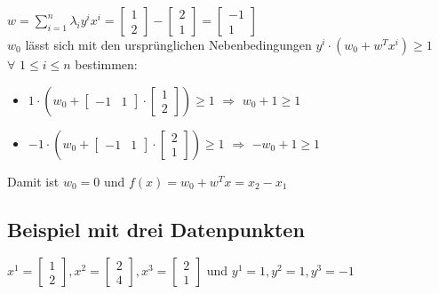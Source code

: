\documentclass{report}
\begin{document}
$w = \sum_{i=1}^n\lambda_iy^ix^i = \begin{bmatrix}1\\2\end{bmatrix} - \begin{bmatrix}2\\1\end{bmatrix} =
\begin{bmatrix}-1\\1\end{bmatrix}$\\
$w_0$ lässt sich mit den ursprünglichen Nebenbedingungen $y^i\cdot(w_0 + w^Tx^i)\geq 1$\\
$\forall$ $1\leq i\leq n$ bestimmen:\\
\vspace*{-1.5em}
\begin{itemize}
  \item $1\cdot(w_0 + \begin{bmatrix}-1&1\end{bmatrix}\cdot\begin{bmatrix}1\\2\end{bmatrix}) \geq 1$ $\Rightarrow$ $w_0 + 1\geq 1$
  \item $-1\cdot(w_0 + \begin{bmatrix}-1&1\end{bmatrix}\cdot\begin{bmatrix}2\\1\end{bmatrix}) \geq 1$ $\Rightarrow$ $-w_0 + 1\geq 1$
\end{itemize}
Damit ist $w_0 = 0$ und $f(x) = w_0 + w^Tx = x_2 - x_1$

\subsection{Beispiel mit drei Datenpunkten}
$x^1 = \begin{bmatrix}1\\2\end{bmatrix}, x^2 = \begin{bmatrix}2\\4\end{bmatrix}, x^3 = \begin{bmatrix}2\\1\end{bmatrix}$
und $y^1 = 1, y^2 = 1, y^3 = -1$
\end{document}
